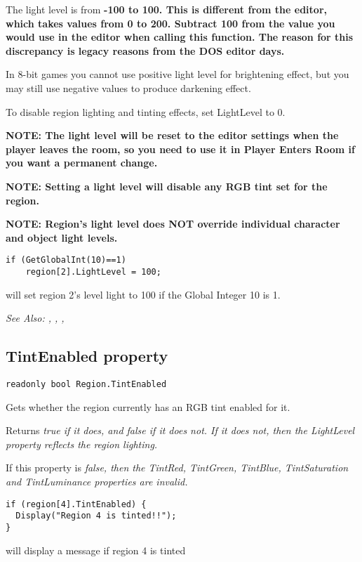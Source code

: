 The light level is from \bf{-100 to 100}. This is different from the editor, which
takes values from 0 to 200.
Subtract 100 from the value you would use in the editor when calling this function.
The reason for this discrepancy is legacy reasons from the DOS editor days.

In 8-bit games you cannot use positive light level for brightening effect, but you
may still use negative values to produce darkening effect.

To disable region lighting and tinting effects, set LightLevel to 0.

\bf{NOTE}: The light level will be reset to the editor settings when the player leaves the
room, so you need to use it in Player Enters Room if you want a permanent
change.

\bf{NOTE}: Setting a light level will disable any RGB tint set for the region.

\bf{NOTE:} Region's light level does NOT override individual character and object light levels.

\begin{verbatim}
if (GetGlobalInt(10)==1)
    region[2].LightLevel = 100;
\end{verbatim}
will set region 2's level light to 100 if the Global Integer 10 is 1.

\it{See Also:} ,
,
,


\subsection{TintEnabled property}\label{Region.TintEnabled}%

\begin{verbatim}
readonly bool Region.TintEnabled
\end{verbatim}
Gets whether the region currently has an RGB tint enabled for it.

Returns \it{true} if it does, and \it{false} if it does not. If it does not, then
the LightLevel property reflects the region lighting.

If this property is \it{false}, then the TintRed, TintGreen, TintBlue, TintSaturation and TintLuminance
properties are invalid.

\begin{verbatim}
if (region[4].TintEnabled) {
  Display("Region 4 is tinted!!");
}
\end{verbatim}
will display a message if region 4 is tinted

